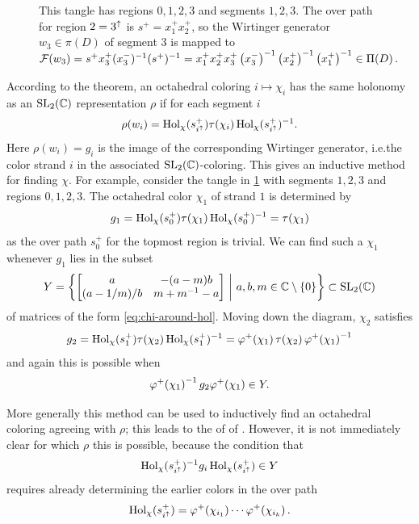 \documentclass[leqno]{sl2art}
\begin{document}
\begin{figure}
  \centering
  
\caption{
  This tangle has regions \(0, 1, 2, 3\) and segments \(1, 2, 3\).
  The over path for region \(2 = 3^{\uparrow}\) is \(s^+ = x_1^+ x_2^+\), so the Wirtinger generator \(w_3 \in \pi(D)\) of segment \(3\) is mapped to \( \mathcal{F}(w_3) = s^+ x_3^+ (x_3^-)^{-1} (s^+)^{-1} = x_1^+ x_2^+ x_3^+ \left(x_3^- \right)^{-1} \left(x_2^+\right)^{-1} \left(x_1^+\right)^{-1} \in  \Pi\mathopen{}\left(D\right).\)
}
  \label{fig:path-factorization}
\end{figure}

According to the theorem, an octahedral coloring \(i \mapsto \chi_i\) has the same holonomy as an  \(\operatorname{SL}_2(\mathbb{C})\) representation \(\rho\) if for each segment \(i\)
\[
  \rho(w_i) = \operatorname{Hol}_{\chi}(s_{i^{\uparrow}}^+) \tau\mathopen{}\left(\chi_i\right) \operatorname{Hol}_{\chi}(s_{i^{\uparrow}}^+)^{-1}.
\]
Here \(\rho(w_i) = g_i\) is the image of the corresponding Wirtinger generator, i.e.\@ the color strand \(i\) in the associated \(\operatorname{SL}_2(\mathbb{C})\)-coloring.
This gives an inductive method for finding \(\chi\).
For example, consider the tangle in \cref{fig:path-factorization} with segments \(1, 2, 3\) and regions \(0, 1, 2, 3\).
The octahedral color \(\chi_1\) of strand \(1\) is determined by
\[
  g_1 = \operatorname{Hol}_{\chi}(s_0^+) \tau\mathopen{}\left(\chi_1\right) \operatorname{Hol}_{\chi}(s_0^+)^{-1}
  = \tau\mathopen{}\left(\chi_1\right)
\]
as the over path \(s_0^+\) for the topmost region is trivial.
We can find such a \(\chi_1\) whenever \(g_1\) lies in the subset 
\[
  Y
  =
  \set{ 
    \begin{bmatrix}
      a & -(a-m) b \\
      (a-1/m)/b & m + m^{-1} -a
    \end{bmatrix}
    \given
    a, b, m \in \mathbb{C} \setminus \{0\}
  }
  \subset \slg
\]
of matrices of the form \eqref{eq:chi-around-hol}.
Moving down the diagram, \(\chi_2\) satisfies
\[
  g_2 = \operatorname{Hol}_{\chi}(s_1^+) \tau\mathopen{}\left(\chi_2\right) \operatorname{Hol}_{\chi}(s_1^+)^{-1}
  = \varphi^+\mathopen{}\left(\chi_1\right) \tau\mathopen{}\left(\chi_2\right) \varphi^+\mathopen{}\left(\chi_1\right)^{-1}
\]
and again this is possible when
\[
  \varphi^+\mathopen{}\left(\chi_1\right)^{-1} g_2 \varphi^+\mathopen{}\left(\chi_1\right) \in Y.
\]

More generally this method can be used to inductively find an octahedral coloring agreeing with \(\rho\);
this leads to the  of of \textcite{Blanchet2018}.%
However, it is not immediately clear for which \(\rho\) this is possible, because the condition that
\[
  \operatorname{Hol}_{\chi}(s_{i^{\uparrow}}^+)^{-1} g_i \operatorname{Hol}_{\chi}(s_{i^{\uparrow}}^+)
  \in Y
\]
requires already determining the earlier colors in the over path
\[
  \operatorname{Hol}_{\chi}(s_{i^{\uparrow}}^+) 
  =
  \varphi^+\mathopen{}\left(\chi_{i_1}\right) \cdots \varphi^+\mathopen{}\left(\chi_{i_k}\right).
\]
\end{document}
